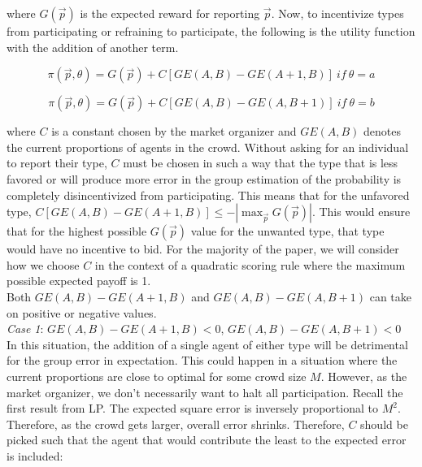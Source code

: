 \documentclass[twoside,twocolumn]{article}
\begin{document}
where $G(\vec{p})$ is the expected reward for reporting $\vec{p}$. Now, to incentivize types from participating or refraining to participate, the following is the utility function with the addition of another term.

\begin{equation}
\label{strictutil1}
\pi(\vec{p}, \theta) = G(\vec{p}) + C[GE(A,B) - GE(A+1,B)] \ if \ \theta=a
\end{equation}

\begin{equation}
\label{strictutil2}
\pi(\vec{p}, \theta) = G(\vec{p}) + C[GE(A,B) - GE(A,B+1)] \ if \ \theta=b
\end{equation}

where $C$ is a constant chosen by the market organizer and $GE(A,B)$ denotes the current proportions of agents in the crowd. Without asking for an individual to report their type, $C$ must be chosen in such a way that the type that is less favored or will produce more error in the group estimation of the probability is completely disincentivized from participating. This means that for the unfavored type, $C[GE(A,B) - GE(A+1,B)] \leq -|\max_{\vec{p}}G(\vec{p})|$. This would ensure that for the highest possible $G(\vec{p})$ value for the unwanted type, that type would have no incentive to bid. For the majority of the paper, we will consider how we choose $C$ in the context of a quadratic scoring rule where the maximum possible expected payoff is 1.\\

Both $GE(A,B) - GE(A+1,B)$ and $GE(A,B) - GE(A,B+1)$ can take on positive or negative values. \\

\textit{Case 1}: $GE(A,B) - GE(A+1,B) < 0$, $GE(A,B) - GE(A,B+1) < 0$\\

In this situation, the addition of a single agent of either type will be detrimental for the group error in expectation. This could happen in a situation where the current proportions are close to optimal for some crowd size $M$. However, as the market organizer, we don't necessarily want to halt all participation. Recall the first result from LP. The expected square error is inversely proportional to $M^2$. Therefore, as the crowd gets larger, overall error shrinks. Therefore, $C$ should be picked such that the agent that would contribute the least to the expected error is included:\\

\\
\newline
\end{document}

